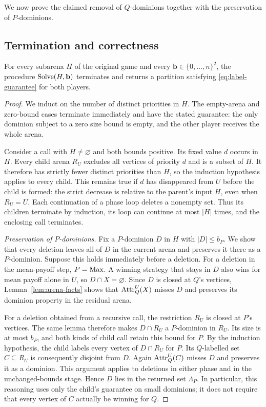We now prove the claimed removal of $Q$-dominions together with the
preservation of $P$-dominions.

\subsection{Termination and correctness}

\begin{theorem}
\label{thm:labels}
For every subarena $H$ of the original game and every
$\mathbf b\in\{0,\ldots,n\}^2$, the procedure
$\operatorname{Solve}(H,\mathbf b)$ terminates and returns a partition satisfying
\eqref{eq:label-guarantee} for both players.
\end{theorem}

\begin{proof}
We induct on the number of distinct priorities in $H$.  The empty-arena
and zero-bound cases terminate immediately and have the stated
guarantee: the only dominion subject to a zero size bound is empty, and
the other player receives the whole arena.

Consider a call with $H\ne\varnothing$ and both bounds positive.  Its
fixed value $d$ occurs in $H$.  Every child arena $R_U$ excludes all
vertices of priority $d$ and is a subset of $H$.  It therefore has
strictly fewer distinct priorities than $H$, so the induction hypothesis
applies to every child.  This remains true if $d$ has disappeared from
$U$ before the child is formed: the strict decrease is relative to the
parent's input $H$, even when $R_U=U$.  Each continuation of a phase loop
deletes a nonempty set.  Thus its children terminate by induction, its
loop can continue at most $|H|$ times, and the enclosing call terminates.

\emph{Preservation of $P$-dominions.}
Fix a $P$-dominion $D$ in $H$ with $|D|\le b_P$.  We show that every
deletion leaves all of $D$ in the current arena and preserves it there
as a $P$-dominion.  Suppose this holds immediately before a deletion.
For a deletion in the mean-payoff step, $P=\mathrm{Max}$.  A winning strategy
that stays in $D$ also wins for mean payoff alone in $U$, so
$D\cap X=\varnothing$.  Since $D$ is closed at $Q$'s vertices,
Lemma~\ref{lem:arena-facts} shows that
$\operatorname{Attr}_Q^U(X)$ misses $D$ and preserves its dominion property in the
residual arena.

For a deletion obtained from a recursive call, the restriction $R_U$
is closed at $P$'s vertices.  The same lemma therefore makes
$D\cap R_U$ a $P$-dominion in $R_U$.  Its size is at most $b_P$, and
both kinds of child call retain this bound for $P$.  By the induction
hypothesis, the child labels every vertex of $D\cap R_U$ for $P$.
Its $Q$-labelled set $C\subseteq R_U$ is consequently disjoint from
$D$.  Again $\operatorname{Attr}_Q^U(C)$ misses $D$ and preserves it as a dominion.
This argument applies to deletions in either phase and in the
unchanged-bounds stage.  Hence $D$ lies in the returned set $\Lambda_P$.
In particular, this reasoning uses only the child's guarantee on small
dominions; it does not require that every vertex of $C$ actually be
winning for $Q$.


\end{proof}
